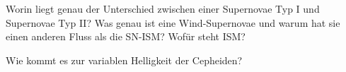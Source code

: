 \begin{frame}{Worin liegt genau der Unterschied zwischen einer Supernovae Typ I und Supernovae Typ II?
Was genau ist eine Wind-Supernovae und warum hat sie einen anderen Fluss als die SN-ISM? Wofür steht ISM?}
\end{frame}

\begin{frame}{Wie kommt es zur variablen Helligkeit der Cepheiden?}
\end{frame}
